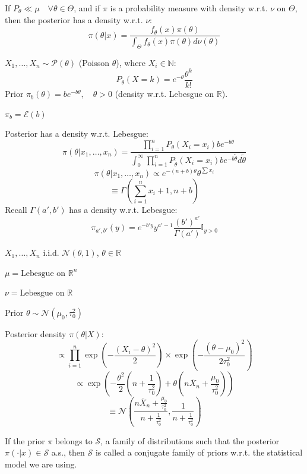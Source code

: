\documentclass[11pt, a4paper]{article}
\newcounter{theorem}[section]
\begin{document}
\begin{theorem}
If $P_\theta \ll \mu \quad \forall \theta \in \Theta$, and if $\pi$ is a probability measure with density w.r.t. $\nu$ on $\Theta$, then the posterior has a density w.r.t. $\nu$:
\[ \pi(\theta|x) = \frac{f_\theta(x)\pi(\theta)}{\int_{\Theta} f_\theta(x)\pi(\theta)d\nu(\theta)} \]
\end{theorem}

\begin{example} 
$X_1, \dots, X_n \sim \mathcal{P}(\theta)$ (Poisson $\theta$), where $X_i \in \mathbb{N}$:
\[ P_\theta(X=k) = e^{-\theta} \frac{\theta^k}{k!} \]
Prior $\pi_b(\theta) = b e^{-b\theta}, \quad \theta > 0$ (density w.r.t. Lebesgue on $\mathbb{R}$). 

$\pi_b = \mathcal{E}(b)$

Posterior has a density w.r.t. Lebesgue:
\[ \pi(\theta | x_1, \dots, x_n) = \frac{\prod_{i=1}^{n} P_\theta(X_i=x_i) b e^{-b\theta}}{\int_{0}^{\infty} \prod_{i=1}^{n} P_{\tilde{\theta}}(X_i=x_i) b e^{-b\tilde{\theta}} d\tilde{\theta}} \]
\[ \pi(\theta | x_1, \dots, x_n) \propto e^{-(n+b)\theta} \theta^{\sum x_i} \]
\[ \equiv \Gamma\left(\sum_{i=1}^{n}x_i + 1, n+b\right) \]
Recall $\Gamma(a', b')$ has a density w.r.t. Lebesgue:
\[ \pi_{a',b'}(y) = e^{-b'y} y^{a'-1} \frac{(b')^{a'}}{\Gamma(a')} \mathbb{I}_{y>0} \]
\end{example}

\begin{example}
$X_1, \dots, X_n$ i.i.d. $\mathcal{N}(\theta, 1)$, $\theta \in \mathbb{R}$

$\mu = \text{Lebesgue on } \mathbb{R}^n$

$\nu = \text{Lebesgue on } \mathbb{R}$

Prior $\theta \sim \mathcal{N}(\mu_0, \tau_0^2)$

Posterior density $\pi(\theta | X)$:
\[ \propto \prod_{i=1}^{n} \exp\left(-\frac{(X_i-\theta)^2}{2}\right) \times \exp\left(-\frac{(\theta-\mu_0)^2}{2\tau_0^2}\right) \]
\[ \propto \exp\left(-\frac{\theta^2}{2}\left(n+\frac{1}{\tau_0^2}\right) + \theta\left(n\overline{X}_n + \frac{\mu_0}{\tau_0^2}\right)\right) \]
\[ \equiv \mathcal{N}\left(\frac{n\overline{X}_n + \frac{\mu_0}{\tau_0^2}}{n + \frac{1}{\tau_0^2}}, \frac{1}{n + \frac{1}{\tau_0^2}}\right) \]
\end{example}

\begin{definition}
If the prior $\pi$ belongs to $\mathcal{S}$, a family of distributions such that the posterior $\pi(\cdot|x) \in \mathcal{S}$ a.s., then $\mathcal{S}$ is called a conjugate family of priors w.r.t. the statistical model we are using.
\end{definition}
\end{document}
